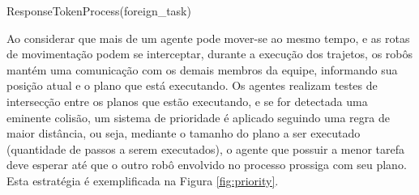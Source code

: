 \begin{algorithm}
  \caption[ResponseTokenProcess]{ResponseTokenProcess(foreign\_task)}
  \label{alg:response_token}

  \begin{algorithmic}[1]

    \ENDIF

    \STATE{}

      \ENDIF
    \ENDFOR


  \end{algorithmic}
\end{algorithm}

Ao considerar que mais de um agente pode mover-se ao mesmo tempo, e as rotas de movimentação podem se interceptar, durante a execução dos trajetos, os robôs mantém uma comunicação com os demais membros da equipe, informando sua posição atual e o plano que está executando.
Os agentes realizam testes de intersecção entre os planos que estão executando, e se for detectada uma eminente colisão, um sistema de prioridade é aplicado seguindo uma regra de maior distância, ou seja, mediante o tamanho do plano a ser executado (quantidade de passos a serem executados), o agente que possuir a menor tarefa deve esperar até que o outro robô envolvido no processo prossiga com seu plano.
Esta estratégia é exemplificada na Figura \ref{fig:priority}.

